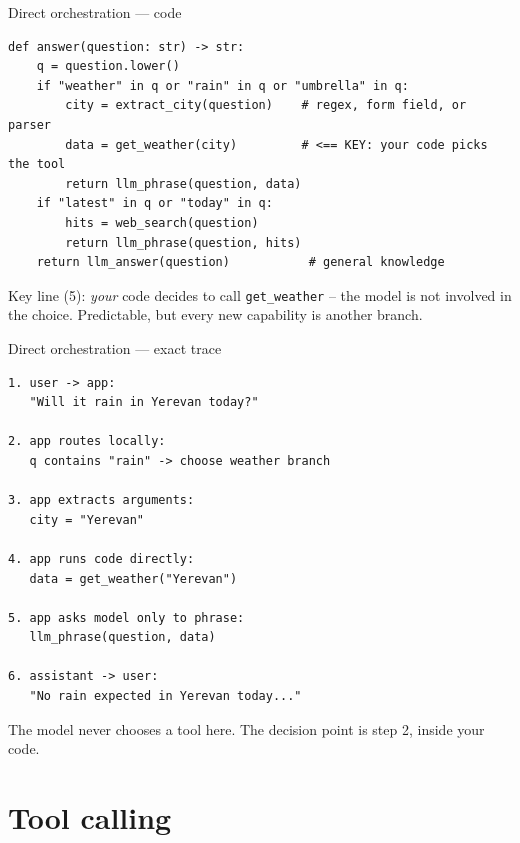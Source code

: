 \documentclass[aspectratio=169,10pt]{beamer}
\begin{document}
\begin{frame}[fragile]{Direct orchestration --- code}
\begin{lstlisting}
def answer(question: str) -> str:
    q = question.lower()
    if "weather" in q or "rain" in q or "umbrella" in q:
        city = extract_city(question)    # regex, form field, or parser
        data = get_weather(city)         # <== KEY: your code picks the tool
        return llm_phrase(question, data)
    if "latest" in q or "today" in q:
        hits = web_search(question)
        return llm_phrase(question, hits)
    return llm_answer(question)           # general knowledge
\end{lstlisting}
\footnotesize \alert{Key line (5):} \emph{your} code decides to call \texttt{get\_weather} --
the model is not involved in the choice. Predictable, but every new capability is another branch.
\end{frame}

\begin{frame}[fragile]{Direct orchestration --- exact trace}
\begin{lstlisting}[style=ascii]
1. user -> app:
   "Will it rain in Yerevan today?"

2. app routes locally:
   q contains "rain" -> choose weather branch

3. app extracts arguments:
   city = "Yerevan"

4. app runs code directly:
   data = get_weather("Yerevan")

5. app asks model only to phrase:
   llm_phrase(question, data)

6. assistant -> user:
   "No rain expected in Yerevan today..."
\end{lstlisting}
\footnotesize The model never chooses a tool here. The decision point is step 2, inside \alert{your code}.
\end{frame}
\section{Tool calling}
\end{document}
